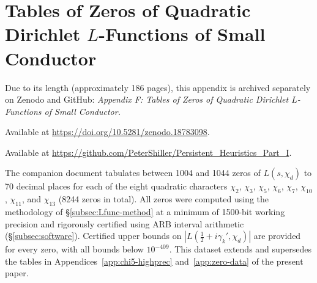 \documentclass[12pt,reqno]{amsart}
\theoremstyle{plain}
\theoremstyle{definition}
\theoremstyle{remark}
\begin{document}

\section{Tables of Zeros of Quadratic Dirichlet \texorpdfstring{$L$}{L}-Functions of Small Conductor}\label{app:full-zero-tables}

Due to its length (approximately 186 pages), this appendix is archived separately on Zenodo and GitHub: \textit{Appendix F: Tables of Zeros of Quadratic Dirichlet $L$-Functions of Small Conductor.}

\medskip
\noindent Available at \url{https://doi.org/10.5281/zenodo.18783098}.

\noindent Available at \url{https://github.com/PeterShiller/Persistent_Heuristics_Part_I}.

\medskip
\noindent The companion document tabulates between 1004 and 1044 zeros of $L(s,\chi_d)$ to 70 decimal places for each of the eight quadratic characters $\chi_2$, $\chi_3$, $\chi_5$, $\chi_6$, $\chi_7$, $\chi_{10}$, $\chi_{11}$, and $\chi_{13}$ (8244 zeros in total).  All zeros were computed using the methodology of \S\ref{subsec:Lfunc-method} at a minimum of 1500-bit working precision and rigorously certified using ARB interval arithmetic (\S\ref{subsec:software}).  Certified upper bounds on $|L(\tfrac{1}{2}+i\gamma_k',\chi_d)|$ are provided for every zero, with all bounds below $10^{-409}$.  This dataset extends and supersedes the tables in Appendices~\ref{app:chi5-highprec} and~\ref{app:zero-data} of the present paper.
\end{document}
